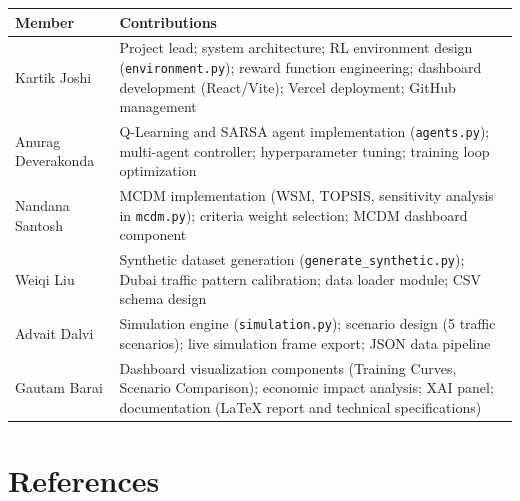 \documentclass[12pt, a4paper]{article}
\begin{document}
\begin{center}
\begin{tabularx}{\textwidth}{l X}
    \toprule
    \textbf{Member} & \textbf{Contributions} \\
    \midrule
    Kartik Joshi & Project lead; system architecture; RL environment design (\texttt{environment.py}); reward function engineering; dashboard development (React/Vite); Vercel deployment; GitHub management \\
    Anurag Deverakonda & Q-Learning and SARSA agent implementation (\texttt{agents.py}); multi-agent controller; hyperparameter tuning; training loop optimization \\
    Nandana Santosh & MCDM implementation (WSM, TOPSIS, sensitivity analysis in \texttt{mcdm.py}); criteria weight selection; MCDM dashboard component \\
    Weiqi Liu & Synthetic dataset generation (\texttt{generate\_synthetic.py}); Dubai traffic pattern calibration; data loader module; CSV schema design \\
    Advait Dalvi & Simulation engine (\texttt{simulation.py}); scenario design (5 traffic scenarios); live simulation frame export; JSON data pipeline \\
    Gautam Barai & Dashboard visualization components (Training Curves, Scenario Comparison); economic impact analysis; XAI panel; documentation (LaTeX report and technical specifications) \\
    \bottomrule
\end{tabularx}
\end{center}

\section*{References}
\end{document}
